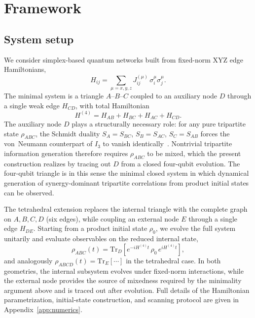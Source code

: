 \documentclass[aps,physrev,preprint,groupedaddress]{revtex4-2}
\begin{document}
\section{Framework}

\subsection{System setup}
We consider simplex-based quantum networks built from fixed-norm XYZ edge Hamiltonians,
\begin{equation}
    H_{ij} = \sum_{\mu=x,y,z} J^{(\mu)}_{ij}\, \sigma_i^\mu \sigma_j^\mu .
\end{equation}
The minimal system is a triangle $A$--$B$--$C$ coupled to an auxiliary node $D$ through a single weak edge $H_{CD}$, with total Hamiltonian
\begin{equation}
    H^{(4)} = H_{AB} + H_{BC} + H_{AC} + H_{CD}.
\end{equation}
The auxiliary node $D$ plays a structurally necessary role: for any pure tripartite state $\rho_{ABC}$, the Schmidt duality $S_A = S_{BC}$, $S_B = S_{AC}$, $S_C = S_{AB}$ forces the von~Neumann counterpart of $I_3$ to vanish identically~\cite{javarone2024QuantifyingHighorder}. Nontrivial tripartite information generation therefore requires $\rho_{ABC}$ to be mixed, which the present construction realizes by tracing out $D$ from a closed four-qubit evolution. The four-qubit triangle is in this sense the minimal closed system in which dynamical generation of synergy-dominant tripartite correlations from product initial states can be observed.

The tetrahedral extension replaces the internal triangle with the complete graph on $A,B,C,D$ (six edges), while coupling an external node $E$ through a single edge $H_{DE}$.
Starting from a product initial state $\rho_0$, we evolve the full system unitarily and evaluate observables on the reduced internal state,
\begin{equation}
    \rho_{ABC}(t) = \mathrm{Tr}_D\!\left[e^{-iH^{(4)}t}\,\rho_0\,e^{iH^{(4)}t}\right],
\end{equation}
and analogously $\rho_{ABCD}(t) = \mathrm{Tr}_E[\cdots]$ in the tetrahedral case.
In both geometries, the internal subsystem evolves under fixed-norm interactions, while the external node provides the source of mixedness required by the minimality argument above and is traced out after evolution.
Full details of the Hamiltonian parametrization, initial-state construction, and scanning protocol are given in Appendix~\ref{app:numerics}.
\end{document}
